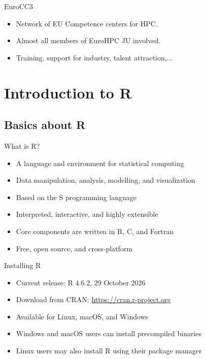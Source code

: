\documentclass[compress,xcolor=table]{beamer}
\newcommand{\pp}{\pause}
\begin{document}
\begin{frame}{EuroCC3}
	\begin{itemize}
		\item Network of EU Competence centers for HPC.\pp
		\item Almost all members of EuroHPC JU involved.\pp
		\item Training, support for industry, talent attraction,...
	\end{itemize}
\end{frame}




\section{Introduction to R} 
\subsection{Basics about R}

\begin{frame}{What is R?} 
	\begin{itemize} 
		\item A language and environment for statistical computing 
		\item Data manipulation, analysis, modelling, and visualization 
		\item Based on the S programming language 
		\item Interpreted, interactive, and highly extensible \item Core components are written in R, C, and Fortran 
		\item Free, open source, and cross-platform 
	\end{itemize} 
\end{frame} 

\begin{frame}{Installing R} 
	\begin{itemize} 
		\item Current release: R 4.6.2, 29 October 2026 
		\item Download from CRAN: \url{https://cran.r-project.org} 
		\item Available for Linux, macOS, and Windows \item Windows and macOS users can install precompiled binaries 
		\item Linux users may also install R using their package manager 
	\end{itemize} 
\end{frame}
\end{document}
